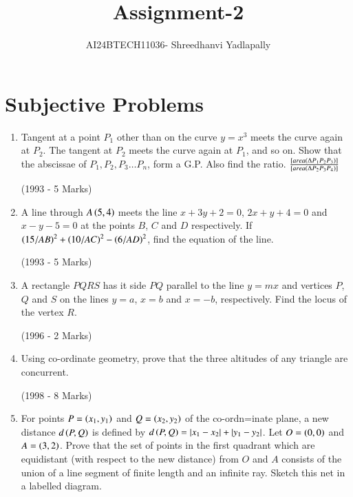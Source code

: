\documentclass[journal,12pt,twocolumn]{IEEEtran}
\theoremstyle{remark}
\begin{document}
\renewcommand{\thefigure}{\theenumi}
\renewcommand{\thetable}{\theenumi}

\vspace{3cm}

\title{Assignment-2 }
\author{AI24BTECH11036- Shreedhanvi Yadlapally}
\maketitle
\newpage
\bigskip
\section{Subjective Problems}
\begin{enumerate}

	\item Tangent at a point $P_{1}$ {other than } on the curve $y=x^{3}$ meets the curve again at $P_{2}$. The tangent at $P_{2}$ meets the curve again at $P_{1}$, and so on. Show that the abscissae of $P_{1}, P_{2}, P_{3} \dots P_{n}$, form a G.P. Also find the ratio. $\frac{{}\left[area(\Delta P_{1}P_{2}P_{3})\right]}{{}\left[area(\Delta P_{2}P_{3}P_{4})\right]}$

	\hfill{(1993 - 5 Marks)}

\item A line through $A \left(5, 4\right)$ meets the line $x+3y+2=0$, $2x+y+4=0$ and $x-y-5=0$ at the points $B$, $C$ and $D$ respectively. If $\left(15/AB\right)^{2}+\left(10/AC\right)^{2}-\left(6/AD\right)^{2}$, find the equation of the line.

	\hfill{(1993 - 5 Marks)}

\item A rectangle $PQRS$ has it side $PQ$ parallel to the line $y=mx$ 
and vertices $P$, $Q$ and $S$ on the lines $y=a$, $x=b$ and $x=-b$, 
respectively. Find the locus of the vertex $R$.
	
		\hfill{(1996 - 2 Marks)}

\item Using co-ordinate geometry, prove that the three altitudes of any triangle are concurrent.

	\hfill{(1998 - 8 Marks)}

\item For points $P=\left(x_{1}, y_{1}\right)$ and $Q=\left(x_{2}, y_{2}\right)$ of the co-ordn=inate plane, a new distance $d\left(P, Q\right)$ is defined by $d\left(P, Q\right)=\left\vert x_{1}-x_{2}\right\vert+\left\vert y_{1}-y_{2}\right\vert$. Let $O=\left(0, 0\right)$ and $A=\left(3, 2\right)$. Prove that the set of points in the first quadrant which are equidistant (with respect to the new distance) from $O$ and $A$ consists of the union of a line segment of finite length and an infinite ray. Sketch this net in a labelled diagram.


\end{enumerate}
\end{document}
